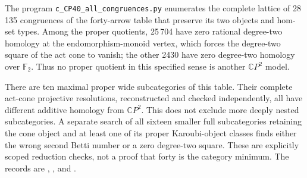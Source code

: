 \begin{remark}\label{C:CP40-reductions}
The program \texttt{c\_CP40\_all\_congruences.py} enumerates the
complete lattice of 28\,135 congruences of the forty-arrow table
that preserve its two objects and hom-set types. Among the proper
quotients, 25\,704 have zero rational degree-two homology at the
endomorphism-monoid vertex, which forces the degree-two square
of the act cone to vanish; the other 2430 have zero degree-two
homology over $\mathbb F_2$. Thus no proper quotient in this
specified sense is another $\mathbb CP^2$ model.

There are ten maximal proper wide subcategories of this table.
Their complete act-cone projective resolutions, reconstructed and
checked independently, all have different additive homology from
$\mathbb CP^2$. This does not exclude more deeply nested
subcategories. A separate search of all sixteen smaller full
subcategories retaining the cone object and at least one of its
proper Karoubi-object classes finds either the wrong second Betti
number or a zero degree-two square. These are explicitly scoped
reduction checks, not a proof that forty is the category minimum.
The records are
,
, and
.
\end{remark}

